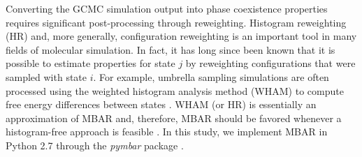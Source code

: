\documentclass[journal=jced,manuscript=article]{achemso}
\begin{document}
%




Converting the GCMC simulation output into phase coexistence properties requires significant post-processing through reweighting. Histogram reweighting (HR) and, more generally, configuration reweighting is an important tool in many fields of molecular simulation. In fact, it has long since been known that it is possible to estimate properties for state $j$ by reweighting configurations that were sampled with state $i$. \cite{McDonald1967,Card1970,Wood1968,Pana2000} For example, umbrella sampling simulations are often processed using the weighted histogram analysis method (WHAM) to compute free energy differences between states \cite{Kumar1992}. WHAM (or HR) is essentially an approximation of MBAR and, therefore, MBAR should be favored whenever a histogram-free approach is feasible \cite{Matos2017}. In this study, we implement MBAR in Python 2.7 through the \textit{pymbar} package \cite{pymbar}. 
\end{document}
